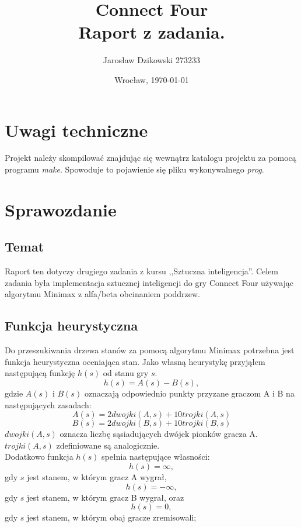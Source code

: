 \documentclass{article}
\author{Jarosław Dzikowski 273233}
\date{Wrocław, \today}
\title{\textbf{Connect Four} \\ Raport z zadania.}
\begin{document}
\maketitle

\section{Uwagi techniczne}
Projekt należy skompilować znajdując się wewnątrz katalogu projektu 
za pomocą programu \emph{make}. 
Spowoduje to pojawienie się pliku wykonywalnego \emph{prog}. 


\section{Sprawozdanie}

\subsection{Temat}
Raport ten dotyczy drugiego zadania z kursu ,,Sztuczna inteligencja''. Celem zadania była implementacja sztucznej inteligencji do gry Connect Four używając algorytmu Minimax z alfa/beta obcinaniem poddrzew.

\subsection{Funkcja heurystyczna}
Do przeszukiwania drzewa stanów za pomocą algorytmu Minimax potrzebna jest funkcja heurystyczna oceniająca stan. Jako własną heurystykę przyjąłem następującą funkcję $h(s)$ od stanu gry $s$.
\begin{equation}
h(s) = A(s) - B(s) ,
\end{equation}
gdzie $A(s)$ i $B(s)$ oznaczają odpowiednio punkty przyzane graczom A i B na następujących zasadach:
\begin{equation}
A(s) = 2 dwojki(A,s) + 10 trojki(A,s)
\end{equation}
\begin{equation}
B(s) = 2 dwojki(B,s) + 10 trojki(B,s)
\end{equation}
$dwojki(A,s)$ oznacza liczbę sąsiadujących dwójek pionków gracza A. $trojki(A,s)$ zdefiniowane są analogicznie.\\
Dodatkowo funkcja $h(s)$ spełnia następujące własności:
\begin{equation}
h(s) = \infty ,
\end{equation}
gdy $s$ jest stanem, w którym gracz A wygrał,
\begin{equation}
h(s) = -\infty ,
\end{equation}
gdy $s$ jest stanem, w którym gracz B wygrał, oraz
\begin{equation}
h(s) = 0 ,
\end{equation}
gdy $s$ jest stanem, w którym obaj gracze zremisowali;
\end{document}
